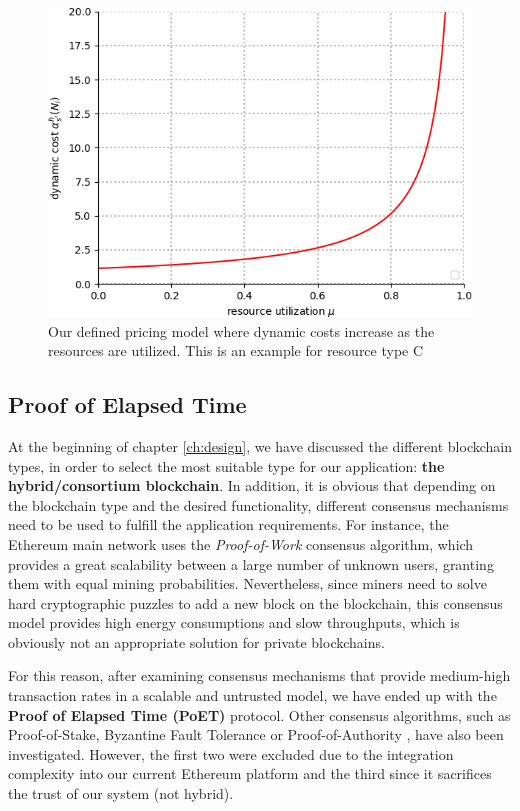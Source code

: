 \begin{figure}[bth]
	\centering
	\includegraphics[scale=0.7]{gfx/pricing_model.png}    
  	\caption{Our defined pricing model where dynamic costs increase as the resources are utilized. This is an example for resource type C}
  	\label{fig:pricing_model}
\end{figure}

\subsection{Proof of Elapsed Time} \label{poet}

At the beginning of chapter \ref{ch:design}, we have discussed the different blockchain types, in order to select the most suitable type for our application: \textbf{the hybrid/consortium blockchain}. In addition, it is obvious that depending on the blockchain type and the desired functionality, different consensus mechanisms need to be used to fulfill the application requirements. For instance, the Ethereum main network uses the \textit{Proof-of-Work} consensus algorithm, which provides a great scalability between a large number of unknown users, granting them with equal mining probabilities. Nevertheless, since miners need to solve hard cryptographic puzzles to add a new block on the blockchain, this consensus model provides high energy consumptions and slow throughputs, which is obviously not an appropriate solution for private blockchains.

For this reason, after examining consensus mechanisms that provide medium-high transaction rates in a scalable and untrusted model, we have ended up with the \textbf{Proof of Elapsed Time (PoET)} protocol. Other consensus algorithms, such as Proof-of-Stake, Byzantine Fault Tolerance or Proof-of-Authority \citep{baliga2017understanding}, have also been investigated. However, the first two were excluded due to the integration complexity into our current Ethereum platform and the third since it sacrifices the trust of our system (not hybrid).

